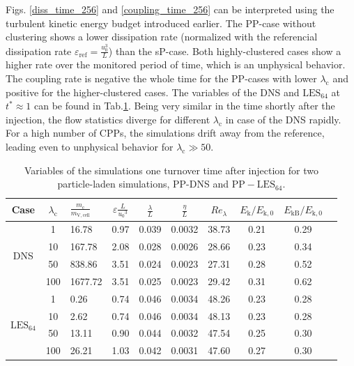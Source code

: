 \documentclass[11pt,a4paper,openany,oneside,parskip=half*]{article}
\begin{document}
\newline
Figs. \ref{diss_time_256} and \ref{coupling_time_256} can be interpreted using the turbulent kinetic energy budget introduced earlier. The PP-case without clustering shows a lower dissipation rate (normalized with the referencial dissipation rate $\varepsilon_\mathrm{ref}=\frac{u_0^3}{L}$) than the sP-case. Both highly-clustered cases show a higher rate over the monitored period of time, which is an unphysical behavior. 
\newline
The coupling rate is negative the whole time for the PP-cases with lower $\lambda_\mathrm{c}$ and positive for the higher-clustered cases. The variables of the DNS and $\mathrm{LES_{64}}$ at $t^* \approx 1$ can be found in Tab.\ref{table_values_DNS_LES}. 
Being very similar in the time shortly after the injection, the flow statistics diverge for different $\lambda_\mathrm{c}$ in case of the DNS rapidly. For a high number of CPPs, the simulations drift away from the reference, leading even to unphysical behavior for $\lambda_\mathrm{c} \gg 50$. 
\begin{table}[]
	\begin{center}
	\begin{tabular}{| c | c l | c c c c c c c |}
	\hline
	Case & $\lambda_\mathrm{c}$& $\frac{m_\mathrm{c}}{m_\mathrm{V,cell}}$ &$\varepsilon \frac{L}{{u_0}^3}$ & $\frac{\lambda}{L}$ & $\frac{\eta}{L} $ & $Re_\lambda$ & $E_\mathrm{k}/E_\mathrm{k,0}$ & $E_\mathrm{kB}/E_\mathrm{k,0}$ & \\
	\hline
	\hline
	\multirow{4}{*}{DNS}
	&1 &16.78 & 0.97& 0.039 & 0.0032 & 38.73 & 0.21 & 0.29 &\\
	&10 &167.78 & 2.08 & 0.028 & 0.0026 & 28.66 & 0.23 & 0.34 &\\
	&50 &838.86 & 3.51 & 0.024 & 0.0023 & 27.31 & 0.28 & 0.52 &\\
	&100 &1677.72 & 3.51 & 0.025 & 0.0023 & 29.42 & 0.31 & 0.62 &\\
	\hline
	\hline
	\multirow{4}{*}{$\mathrm{LES_{64}}$}
	&1 & 0.26 & 0.74 & 0.046 & 0.0034 & 48.26 & 0.23 & 0.28 &\\
	&10 & 2.62 & 0.74 & 0.046 & 0.0034 & 48.13 & 0.23 & 0.28 &\\
	&50 & 13.11 & 0.90 & 0.044 & 0.0032 & 47.54 & 0.25 & 0.30 &\\
	&100 & 26.21 & 1.03 & 0.042 & 0.0031 & 47.60 & 0.27 & 0.30 &\\
	\hline
	\end{tabular}
	\captionsetup{width=0.9\linewidth}
	\caption{Variables of the simulations one turnover time after injection for two particle-laden simulations, PP-DNS and $\mathrm{PP-LES_{64}}$.}
	\label{table_values_DNS_LES}
	\end{center}
	\end{table}
\end{document}
